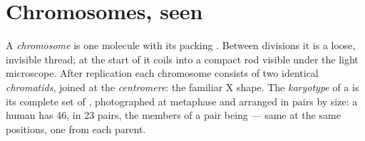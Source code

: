 \section{Chromosomes, seen}

\begin{definition}\label{def:g11:cell-cycle-mitosis:chromosome}
A \emph{chromosome} is one  molecule with its packing .
Between divisions it is a loose, invisible thread; at the start of
 it coils into a compact rod visible under the light microscope.
After replication each chromosome consists of two identical
\emph{chromatids}, joined at the
\emph{centromere}: the familiar X shape. The
\emph{karyotype} of a  is its complete set of
, photographed at metaphase and arranged in pairs by size:
a human  has 46, in 23 pairs, the members of a pair being
\emph{} --- same  at the same positions, one from each
parent.
\end{definition}

